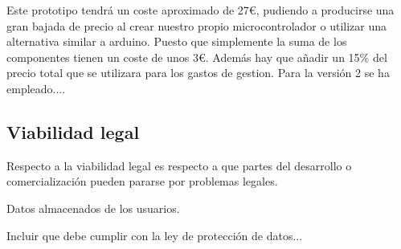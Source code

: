 Este prototipo tendrá un coste aproximado de 27€, pudiendo a producirse una gran bajada de precio al crear nuestro propio microcontrolador o utilizar una alternativa similar a arduino. Puesto que simplemente la suma de los componentes tienen un coste de unos 3€.
Además hay que añadir un 15\% del precio total que se utilizara para los gastos de gestion.
Para la versión 2 se ha empleado....



\subsection{Viabilidad legal}

Respecto a la viabilidad legal es respecto a que partes del desarrollo o comercialización  pueden pararse por problemas legales.

Datos almacenados de los usuarios.

Incluir que debe cumplir con la ley de protección de datos...

